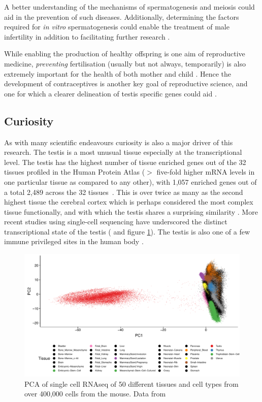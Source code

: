 A better understanding of the mechanisms of spermatogenesis and meiosis could aid in the prevention of such diseases. Additionally, determining the factors required for \emph{in vitro} spermatogenesis could enable the treatment of male infertility in addition to facilitating further research \parencite{Zhou2016Complete}.

While enabling the production of healthy offspring is one aim of reproductive medicine, \emph{preventing} fertilisation (usually but not always, temporarily) is also extremely important for the health of both mother and child \parencite{Cleland2012Contraception}. Hence the development of contraceptives is another key goal of reproductive science, and one for which a clearer delineation of testis specific genes could aid \parencite{Schultz2003multitude}.


\subsection{Curiosity}
As with many scientific endeavours curiosity is also a major driver of this research. The testis is a most unusual tissue especially at the transcriptional level. The testis has the highest number of tissue enriched genes out of the 32 tissues profiled in the Human Protein Atlas ($>$ five-fold higher mRNA levels in one particular tissue as compared to any other), with 1,057 enriched genes out of a total 2,489 across the 32 tissues~\parencite{Djureinovic2014human,Mele2015Human, Uhlen2015Tissuebased, Uhlen2016Transcriptomics, TheHumanProteinAtlas2019human}. This is over twice as many as the second highest tissue the cerebral cortex which is perhaps considered the most complex tissue functionally, and with which the testis shares a surprising similarity \parencite{Guo2005Transcriptomic, Djureinovic2014human, Uhlen2015Tissuebased}. More recent studies using single-cell sequencing have underscored the distinct transcriptional state of the testis (\cite{Han2018Mapping} and figure \ref{fig:MCA_PCA}). The testis is also one of a few immune privileged sites in the human body \parencite{Fijak2006testis}.


\begin{figure}[H]
	\centering
	\includegraphics[width=\textwidth]{figures/intro/MCA_PCA.pdf}
	\caption[Testis PCA (MCA)]{PCA of single cell RNAseq of 50 different tissues and cell types from over 400,000 cells from the mouse. Data from~\cite{Han2018Mapping}}
	\label{fig:MCA_PCA}
\end{figure}


